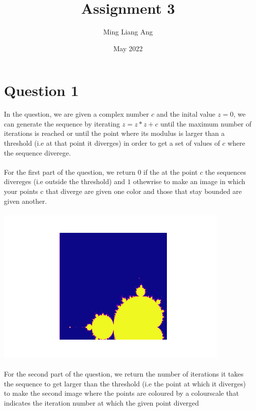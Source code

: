 \documentclass{article}
\title{Assignment 3}
\author{Ming Liang Ang}
\date{May 2022}
\begin{document}
\maketitle

\section{Question 1}
In the question, we are given a complex number $c$ and the inital value $z = 0$, we can generate the sequence by iterating $z=z*z +c$ until the maximum number of iterations is reached or until the 
point where its modulus is larger than a threshold (i.e at that point it diverges) in order to get a set of values of $c$ where the sequence diverege. 
\\\\
For the first part of the question, we return $0$ if the at the point $c$ the sequences divereges (i.e outside the threshold) and $1$ othewrise to make an image in which your points c that diverge
are given one color and those that stay bounded are given another.
\\\\
\includegraphics[width=\textwidth]{mandelbrot1.png}
\\\\
For the second part of the question, we return the number of iterations it takes the sequence to get larger than the threshold (i.e the point at which it diverges) to make the second image where the points
are coloured by a colourscale that indicates the iteration number at which the given point diverged
\\\\
\end{document}
